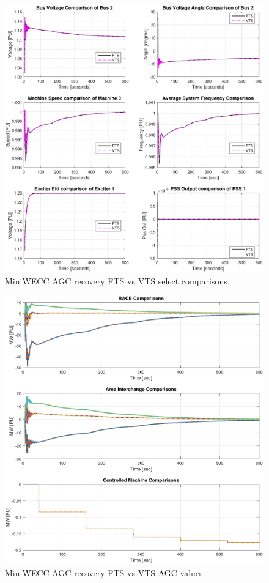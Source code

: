 \begin{figure}[H]
	\centering
	\footnotesize
	\includegraphics[width=\linewidth]{examples/miniWECC/maAGC-2}
	\caption{MiniWECC AGC recovery FTS vs VTS select comparisons.}
	\label{fig: mwAGC comp}
\end{figure}%

\begin{figure}[H]
	\centering
	\footnotesize
	\includegraphics[width=\linewidth]{examples/miniWECC/maAGC-3}
	\caption{MiniWECC AGC recovery FTS vs VTS AGC values.}
	\label{fig: mwAGC agc values}
\end{figure}%